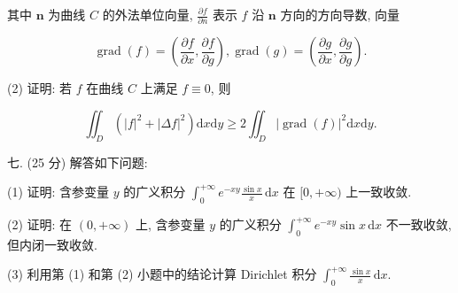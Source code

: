 \documentclass{examcollection}
\renewcommand{\displayformula}[1]{\[#1\]}
\begin{document}
{\begin{minipage}{\textwidth}
其中 $\pmb{n}$ 为曲线 $C$ 的外法单位向量, $\frac{\partial f}{\partial n}$ 表示 $f$ 沿 $\pmb{n}$ 方向的方向导数, 向量\par
\displayformula{\operatorname{grad} (f) = \left(\frac {\partial f}{\partial x}, \frac {\partial f}{\partial g}\right), \operatorname{grad} (g) = \left(\frac {\partial g}{\partial x}, \frac {\partial g}{\partial g}\right).}\par
(2) 证明: 若 $f$ 在曲线 $C$ 上满足 $f \equiv 0$, 则\par
\displayformula{\iint_ {D} \left(| f | ^ {2} + | \Delta f | ^ {2}\right) \mathrm{d} x \mathrm{d} y \geq 2 \iint_ {D} | \operatorname{grad} (f) | ^ {2} \mathrm{d} x \mathrm{d} y.}\par
七. (25 分) 解答如下问题:\par
(1) 证明: 含参变量 $y$ 的广义积分 $\int_{0}^{+\infty} e^{-xy} \frac{\sin x}{x} \, \mathrm{d}x$ 在 $[0, +\infty)$ 上一致收敛.\par
(2) 证明: 在 $(0, +\infty)$ 上, 含参变量 $y$ 的广义积分 $\int_{0}^{+\infty} e^{-xy} \sin x \, \mathrm{d}x$ 不一致收敛, 但内闭一致收敛.\par
(3) 利用第 (1) 和第 (2) 小题中的结论计算 Dirichlet 积分 $\int_{0}^{+\infty} \frac{\sin x}{x} \, \mathrm{d}x$.\par
\end{minipage}}
\ifdim\dimexpr\ht\proofbox+\dp\proofbox\relax>\textheight
\noindent\resizebox{!}{\textheight}{\usebox{\proofbox}}\else\noindent\usebox{\proofbox}\fi\clearpage
\end{document}
